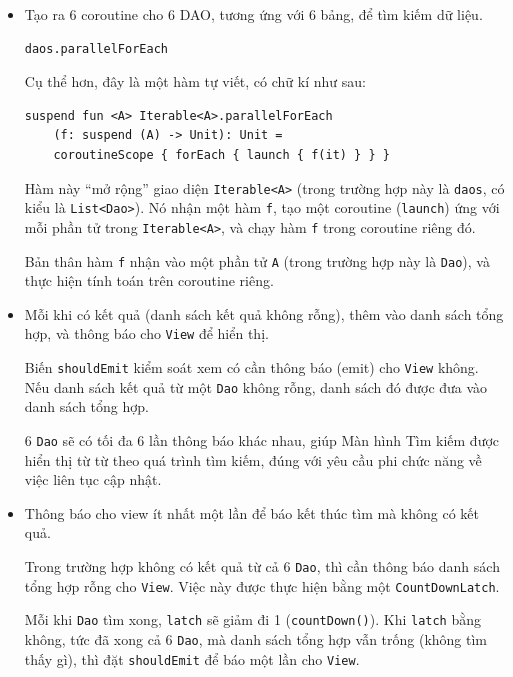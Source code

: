 \documentclass[../../thesis]{subfiles}
\begin{document}
\begin{itemize}
    \item
        Tạo ra 6 coroutine cho 6 DAO, tương ứng với 6 bảng, để tìm kiếm dữ liệu.

        \begin{verbatim}
daos.parallelForEach
        \end{verbatim}

        Cụ thể hơn, đây là một hàm tự viết, có chữ kí như sau:

        \begin{verbatim}
suspend fun <A> Iterable<A>.parallelForEach
    (f: suspend (A) -> Unit): Unit =
    coroutineScope { forEach { launch { f(it) } } }
        \end{verbatim}

        Hàm này ``mở rộng'' giao diện \texttt{Iterable<A>} (trong trường hợp này
        là \texttt{daos}, có kiểu là \texttt{List<Dao>}). Nó nhận một hàm
        \texttt{f}, tạo một coroutine (\texttt{launch}) ứng với mỗi phần tử
        trong \texttt{Iterable<A>}, và chạy hàm \texttt{f} trong coroutine riêng
        đó.

        Bản thân hàm \texttt{f} nhận vào một phần tử \texttt{A} (trong trường
        hợp này là \texttt{Dao}), và thực hiện tính toán trên coroutine riêng.
    \item
        Mỗi khi có kết quả (danh sách kết quả không rỗng), thêm vào danh sách
        tổng hợp, và thông báo cho \texttt{View} để hiển thị.

        Biến \texttt{shouldEmit} kiểm soát xem có cần thông báo (emit) cho
        \texttt{View} không. Nếu danh sách kết quả từ một \texttt{Dao} không
        rỗng, danh sách đó được đưa vào danh sách tổng hợp.

        6 \texttt{Dao} sẽ có tối đa 6 lần thông báo khác nhau, giúp Màn hình Tìm
        kiếm được hiển thị từ từ theo quá trình tìm kiếm, đúng với yêu cầu phi
        chức năng về việc liên tục cập nhật.
    \item
        Thông báo cho view ít nhất một lần để báo kết thúc tìm mà không có kết
        quả.

        Trong trường hợp không có kết quả từ cả 6 \texttt{Dao}, thì cần thông
        báo danh sách tổng hợp rỗng cho \texttt{View}. Việc này được thực hiện
        bằng một \texttt{CountDownLatch}.

        Mỗi khi \texttt{Dao} tìm xong, \texttt{latch} sẽ giảm đi 1
        (\texttt{countDown()}). Khi \texttt{latch} bằng không, tức đã xong cả 6
        \texttt{Dao}, mà danh sách tổng hợp vẫn trống (không tìm thấy gì), thì
        đặt \texttt{shouldEmit} để báo một lần cho \texttt{View}.


\end{itemize}
\end{document}
